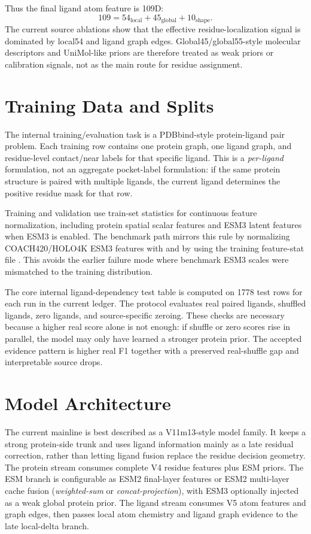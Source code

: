 \documentclass[11pt]{article}
\begin{document}
Thus the final ligand atom feature is 109D:
\[
109 = 54_{\mathrm{local}} + 45_{\mathrm{global}} + 10_{\mathrm{shape}}.
\]
The current source ablations show that the effective residue-localization signal is dominated by local54 and ligand graph edges.
Global45/global55-style molecular descriptors and UniMol-like priors are therefore treated as weak priors or calibration signals, not as the main route for residue assignment.

\section*{Training Data and Splits}
The internal training/evaluation task is a PDBbind-style protein-ligand pair problem.
Each training row contains one protein graph, one ligand graph, and residue-level contact/near labels for that specific ligand.
This is a \emph{per-ligand} formulation, not an aggregate pocket-label formulation: if the same protein structure is paired with multiple ligands, the current ligand determines the positive residue mask for that row.

Training and validation use train-set statistics for continuous feature normalization, including protein spatial scalar features and ESM3 latent features when ESM3 is enabled.
The benchmark path mirrors this rule by normalizing COACH420/HOLO4K ESM3 features with  and by using the training feature-stat file .
This avoids the earlier failure mode where benchmark ESM3 scales were mismatched to the training distribution.

The core internal ligand-dependency test table is computed on 1778 test rows for each run in the current ledger.
The protocol evaluates real paired ligands, shuffled ligands, zero ligands, and source-specific zeroing.
These checks are necessary because a higher real score alone is not enough: if shuffle or zero scores rise in parallel, the model may only have learned a stronger protein prior.
The accepted evidence pattern is higher real F1 together with a preserved real-shuffle gap and interpretable source drops.

\section*{Model Architecture}
The current mainline is best described as a V11m13-style model family.
It keeps a strong protein-side trunk and uses ligand information mainly as a late residual correction, rather than letting ligand fusion replace the residue decision geometry.
The protein stream consumes complete V4 residue features plus ESM priors.
The ESM branch is configurable as ESM2 final-layer features or ESM2 multi-layer cache fusion (\emph{weighted-sum} or \emph{concat-projection}), with ESM3 optionally injected as a weak global protein prior.
The ligand stream consumes V5 atom features and graph edges, then passes local atom chemistry and ligand graph evidence to the late local-delta branch.
\end{document}
